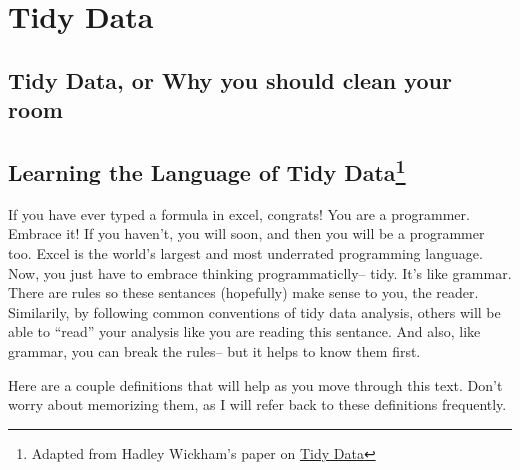 \documentclass[]{book}
\begin{document}
\chapter{Tidy Data}\label{tidy-data}

\section{Tidy Data, or Why you should clean your
room}\label{tidy-data-or-why-you-should-clean-your-room}

\section[Learning the Language of Tidy Data]{\texorpdfstring{Learning
the Language of Tidy Data\footnote{Adapted from Hadley Wickham's paper
  on \href{https://vita.had.co.nz/papers/tidy-data.pdf}{Tidy Data}}}{Learning the Language of Tidy Data}}\label{learning-the-language-of-tidy-data}

If you have ever typed a formula in excel, congrats! You are a
programmer. Embrace it! If you haven't, you will soon, and then you will
be a programmer too. Excel is the world's largest and most underrated
programming language. Now, you just have to embrace thinking
programmaticlly-- tidy. It's like grammar. There are rules so these
sentances (hopefully) make sense to you, the reader. Similarily, by
following common conventions of tidy data analysis, others will be able
to ``read'' your analysis like you are reading this sentance. And also,
like grammar, you can break the rules-- but it helps to know them first.

Here are a couple definitions that will help as you move through this
text. Don't worry about memorizing them, as I will refer back to these
definitions frequently.
\end{document}
